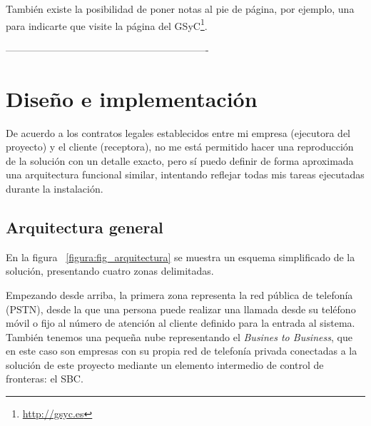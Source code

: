 \documentclass[a4paper, 12pt]{book}
\begin{document}
También existe la posibilidad de poner notas al pie de página, por ejemplo, una para indicarte que visite la página del GSyC\footnote{\url{http://gsyc.es}}.


-------------------------------------------------------------



\chapter{Diseño e implementación}

De acuerdo a los contratos legales establecidos entre mi empresa (ejecutora del proyecto) y el cliente (receptora), no me está permitido hacer una reproducción de la solución con un detalle exacto, pero sí puedo definir de forma aproximada una arquitectura funcional similar, intentando reflejar todas mis tareas ejecutadas durante la instalación.

\section{Arquitectura general}
\label{sec:arquitectura}

En la figura ~\ref{figura:fig_arquitectura} se muestra un esquema simplificado de la solución, presentando cuatro zonas delimitadas. 

Empezando desde arriba, la primera zona representa la red pública de telefonía (PSTN), desde la que una persona puede realizar una llamada desde su teléfono móvil o fijo al número de atención al cliente definido para la entrada al sistema. También tenemos una pequeña nube representando el \emph{Busines to Business}, que en este caso son empresas con su propia red de telefonía privada conectadas a la solución de este proyecto mediante un elemento intermedio de control de fronteras: el SBC.
\end{document}
